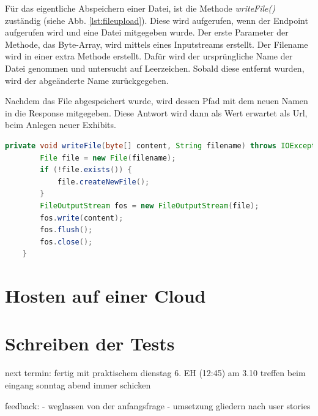 Für das eigentliche Abspeichern einer Datei, ist die Methode \emph{writeFile()} zuständig (siehe Abb. \ref{lst:fileupload}). 
Diese wird aufgerufen, wenn der Endpoint aufgerufen wird und eine Datei mitgegeben wurde. 
Der erste Parameter der Methode, das Byte-Array, wird mittels eines Inputstreams erstellt. 
Der Filename wird in einer extra Methode erstellt. 
Dafür wird der ursprüngliche Name der Datei genommen und untersucht auf Leerzeichen. 
Sobald diese entfernt wurden, wird der abgeänderte Name zurückgegeben. 

Nachdem das File abgespeichert wurde, wird dessen Pfad mit dem neuen Namen in die Response mitgegeben. 
Diese Antwort wird dann als Wert erwartet als Url, beim Anlegen neuer Exhibits. 


\begin{lstlisting}[label=lst:fileupload, language=Java, caption=Hochladen der Dateien]
    private void writeFile(byte[] content, String filename) throws IOException {
        File file = new File(filename);
        if (!file.exists()) {
            file.createNewFile();
        }
        FileOutputStream fos = new FileOutputStream(file);
        fos.write(content);
        fos.flush();
        fos.close();
    }
\end{lstlisting}



\section{Hosten auf einer Cloud}

\section{Schreiben der Tests}

next termin:
    fertig mit praktischem dienstag 6. EH (12:45) am 3.10 treffen beim eingang
    sonntag abend immer schicken

feedback:
- weglassen von der anfangsfrage
- umsetzung gliedern nach user stories